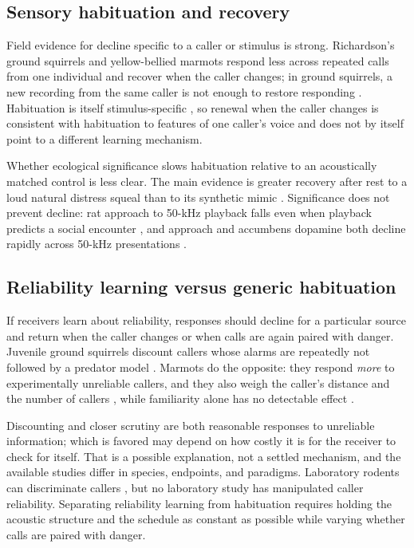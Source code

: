 \subsection{Sensory habituation and recovery}
\label{sec:persistence-habituation}

Field evidence for decline specific to a caller or stimulus is strong. Richardson's ground squirrels and yellow-bellied marmots respond less across repeated calls from one individual and recover when the caller changes; in ground squirrels, a new recording from the same caller is not enough to restore responding \citep{Hare1998,BlumsteinDaniel2004}. Habituation is itself stimulus-specific \citep{RankinEtAl2009}, so renewal when the caller changes is consistent with habituation to features of one caller's voice and does not by itself point to a different learning mechanism.

Whether ecological significance slows habituation relative to an acoustically matched control is less clear. The main evidence is greater recovery after rest to a loud natural distress squeal than to its synthetic mimic \citep{EvansHammond1983a}. Significance does not prevent decline: rat approach to 50-kHz playback falls even when playback predicts a social encounter \citep{BerzEtAl2022}, and approach and accumbens dopamine both decline rapidly across 50-kHz presentations \citep{WilluhnEtAl2014}.

\subsection{Reliability learning versus generic habituation}
\label{sec:persistence-reliability}

If receivers learn about reliability, responses should decline for a particular source and return when the caller changes or when calls are again paired with danger. Juvenile ground squirrels discount callers whose alarms are repeatedly not followed by a predator model \citep{HareAtkins2001}. Marmots do the opposite: they respond \emph{more} to experimentally unreliable callers, and they also weigh the caller's distance and the number of callers \citep{BlumsteinEtAl2004}, while familiarity alone has no detectable effect \citep{BlumsteinDaniel2004}.

Discounting and closer scrutiny are both reasonable responses to unreliable information; which is favored may depend on how costly it is for the receiver to check for itself. That is a possible explanation, not a settled mechanism, and the available studies differ in species, endpoints, and paradigms. Laboratory rodents can discriminate callers \citep{VielleEtAl2021,WarrenEtAl2025}, but no laboratory study has manipulated caller reliability. Separating reliability learning from habituation requires holding the acoustic structure and the schedule as constant as possible while varying whether calls are paired with danger.


